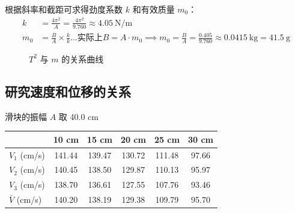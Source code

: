 \documentclass[11pt]{article}
\begin{document}
根据斜率和截距可求得劲度系数 $k$ 和有效质量 $m_0$：
\begin{align*}
k &= \frac{4\pi^2}{A} = \frac{4\pi^2}{9.760} \approx 4.05\ \mathrm{N/m} \\
m_0 &= \frac{B}{A} \times \frac{k}{k} \dots \text{实际上} B = A \cdot m_0 \implies m_0 = \frac{B}{A} = \frac{0.405}{9.760} \approx 0.0415\ \mathrm{kg} = 41.5\ \mathrm{g}
\end{align*}

\begin{figure}[H]
    \centering
    \caption{$T^2$ 与 $m$ 的关系曲线}
    \label{fig:T2-m}
\end{figure}

\subsection{研究速度和位移的关系}

滑块的振幅 $A$ 取 40.0 cm

\begin{table}[h]
    \centering
    \begin{tabular}{lccccc}
        \toprule
        & 10 cm & 15 cm & 20 cm & 25 cm & 30 cm \\
        \midrule
        $V_1$ (cm/s) & 141.44 & 139.47 & 130.72 & 111.48 & 97.66 \\
        $V_2$ (cm/s) & 140.45 & 138.50 & 129.87 & 110.13 & 95.97 \\
        $V_3$ (cm/s) & 138.70 & 136.61 & 127.55 & 107.76 & 93.46 \\
        \midrule
        $\bar{V}$ (cm/s) & 140.20 & 138.19 & 129.38 & 109.79 & 95.70 \\
        \bottomrule
    \end{tabular}
\end{table}
\end{document}
